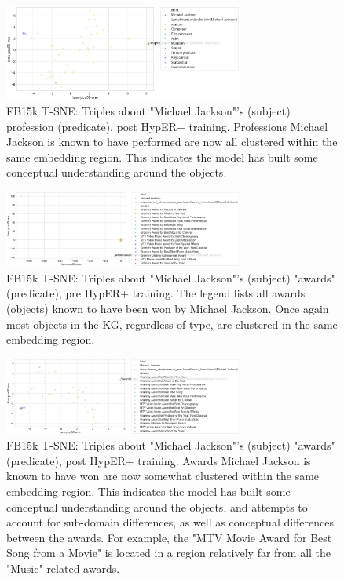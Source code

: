 \begin{figure}
   	\centering
    	\includegraphics[width=0.7\textwidth, height=0.3\textheight]{t_sne_test_profession}
	\captionsetup{justification=centering}
	\caption{FB15k T-SNE: Triples about "Michael Jackson"'s (subject) profession (predicate), post HypER+ training. Professions Michael Jackson is known to have performed are now all clustered within the same embedding region. This indicates the model has built some conceptual understanding around the objects.}
\end{figure}

\begin{figure}
   	\centering
    	\includegraphics[width=0.7\textwidth, height=0.3\textheight]{t_sne_train_award}
	\captionsetup{justification=centering}
	\caption{FB15k T-SNE: Triples about "Michael Jackson"'s (subject) "awards" (predicate), pre HypER+ training. The legend lists all awards (objects) known to have been won by Michael Jackson. Once again most objects in the KG, regardless of type, are clustered in the same embedding region.}
\end{figure}

\begin{figure}
   	\centering
    	\includegraphics[width=0.7\textwidth, height=0.3\textheight]{t_sne_test_award}
	\captionsetup{justification=centering}
	\caption{FB15k T-SNE: Triples about "Michael Jackson"'s (subject) "awards" (predicate), post HypER+ training. Awards Michael Jackson is known to have won are now somewhat clustered within the same embedding region. This indicates the model has built some conceptual understanding around the objects, and attempts to account for sub-domain differences, as well as conceptual differences between the awards. For example, the "MTV Movie Award for Best Song from a Movie" is located in a region relatively far from all the "Music"-related awards.}
\end{figure}


